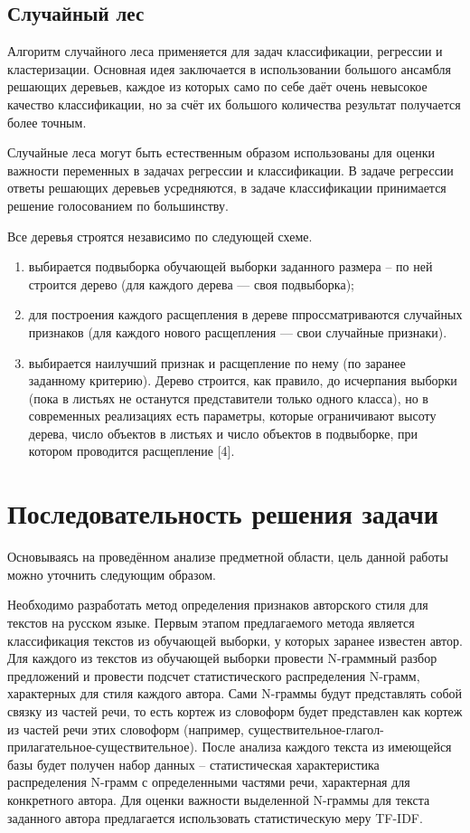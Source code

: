 \subsection{Случайный лес}

Алгоритм случайного леса применяется для задач классификации, регрессии и кластеризации. Основная идея заключается в использовании большого ансамбля решающих деревьев, каждое из которых само по себе даёт очень невысокое качество классификации, но за счёт их большого количества результат получается более точным.

Случайные леса могут быть естественным образом использованы для оценки важности переменных в задачах регрессии и классификации.  В задаче регрессии ответы решающих деревьев усредняются, в задаче классификации принимается решение голосованием по большинству. 

Все деревья строятся независимо по следующей схеме.
\begin{enumerate}
\item выбирается подвыборка обучающей выборки заданного размера – по ней строится дерево (для каждого дерева — своя подвыборка);
\item для построения каждого расщепления в дереве ппроссматриваются случайных признаков (для каждого нового расщепления — свои случайные признаки).
\item выбирается наилучший признак и расщепление по нему (по заранее заданному критерию). Дерево строится, как правило, до исчерпания выборки (пока в листьях не останутся представители только одного класса), но в современных реализациях есть параметры, которые ограничивают высоту дерева, число объектов в листьях и число объектов в подвыборке, при котором проводится расщепление [4].
\end{enumerate}

\section{Последовательность решения задачи}

Основываясь на проведённом анализе предметной области, цель данной работы можно уточнить следующим образом. 

Необходимо разработать метод определения признаков авторского стиля для текстов на русском языке. 
Первым этапом предлагаемого метода является классификация текстов из обучающей выборки, у которых заранее известен автор. Для каждого из текстов из обучающей выборки провести N-граммный разбор предложений и провести подсчет статистического распределения N-грамм, характерных для стиля каждого автора. Сами N-граммы будут представлять собой связку из частей речи, то есть кортеж из словоформ будет представлен как кортеж из частей речи этих словоформ (например, существительное-глагол-прилагательное-существительное).  
После анализа каждого текста из имеющейся базы будет получен набор данных – статистическая характеристика распределения N-грамм с определенными частями речи, характерная для конкретного автора. Для оценки важности выделенной N-граммы для текста заданного автора предлагается использовать статистическую меру TF-IDF.

